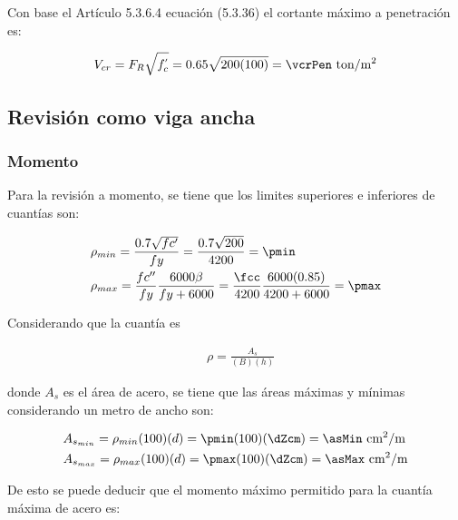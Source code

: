 \documentclass[11pt,a4paper,fleqn]{article}
\begin{document}
Con base el Artículo 5.3.6.4 ecuación (5.3.36) el cortante máximo a penetración es:



\begin{align*}
		V_{cr}=F_R\sqrt{f^{'}_{c}}=0.65\sqrt{\fc(100)}=\vcrPen \text{ ton/m$^2$}
\end{align*}
	
\subsection{Revisión como viga ancha}
\subsubsection{Momento}
Para la revisión a momento, se tiene que los limites superiores e inferiores de cuantías son:


\begin{align*}
	&\rho_{min}=\frac{0.7\sqrt{fc'}}{fy}                   =\frac{0.7\sqrt{\fc}}{\fy}                     =\pmin\\
	&\rho_{max}=\frac{fc''}{fy}\frac{6000\beta}{fy+6000}   =\frac{\fcc}{\fy}\frac{6000(0.85)}{\fy+6000}   =\pmax
\end {align*}

Considerando que la cuantía es

\begin{align*}
	&\rho=\frac{A_s}{(B)(h)}
\end {align*}

donde $A_s$ es el área de acero, se tiene que las áreas máximas y mínimas considerando un metro de ancho son:

\begin{align*}
	&A_{s_{min}}=\rho_{min}(100)(d)=\pmin(100)(\dZcm)= \asMin \text{ cm$^2$/m} \\
	&A_{s_{max}}=\rho_{max}(100)(d)=\pmax(100)(\dZcm)= \asMax \text{ cm$^2$/m}
\end{align*}

De esto se puede deducir que el momento máximo permitido para la cuantía máxima de acero es:
\end{document}
